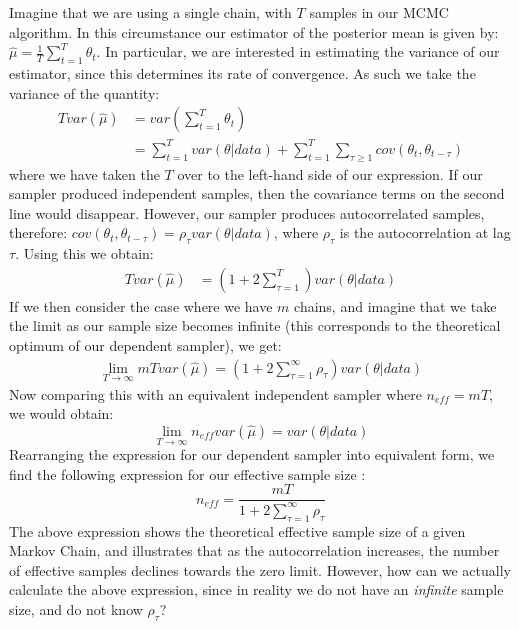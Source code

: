 \documentclass[11pt,fullpage]{book}
\begin{document}
Imagine that we are using a single chain, with $T$ samples in our MCMC algorithm. In this circumstance our estimator of the posterior mean is given by: $\hat{\mu}=\frac{1}{T}\sum\limits_{t=1}^{T} \theta_t$. In particular, we are interested in estimating the variance of our estimator, since this determines its rate of convergence. As such we take the variance of the quantity:
%
\begin{equation}
\begin{align}
T var(\hat{\mu}) &= var(\sum\limits_{t=1}^{T} \theta_t)\\
&= \sum\limits_{t=1}^{T} var(\theta|data) + \sum\limits_{t=1}^{T} \sum\limits_{\tau\geq 1} cov(\theta_t,\theta_{t-\tau})
\end{align}
\end{equation}
%
where we have taken the $T$ over to the left-hand side of our expression. If our sampler produced independent samples, then the covariance terms on the second line would disappear. However, our sampler produces autocorrelated samples, therefore: $cov(\theta_t,\theta_{t-\tau}) = \rho_\tau var(\theta|data)$, where $\rho_\tau$ is the autocorrelation at lag $\tau$. Using this we obtain:
%
\begin{equation}
\begin{align}
T var(\hat{\mu}) &= \left(1+ 2 \sum\limits_{\tau=1}^{T}\right) var(\theta|data)
\end{align}
\end{equation}
%
If we then consider the case where we have $m$ chains, and imagine that we take the limit as our sample size becomes infinite (this corresponds to the theoretical optimum of our dependent sampler), we get:
%
\begin{equation}
\begin{align}
\lim\limits_{T\rightarrow\infty} m T var(\hat{\mu}) = \left(1 + 2 \sum\limits_{\tau=1}^{\infty}\rho_\tau\right)var(\theta|data)
\end{align}
\end{equation}
%
Now comparing this with an equivalent independent sampler where $n_{eff} = m T$, we would obtain:
%
\begin{equation}
\lim\limits_{T\rightarrow\infty} n_{eff} var(\hat{\mu}) = var(\theta|data)
\end{equation}
%
Rearranging the expression for our dependent sampler into equivalent form, we find the following expression for our effective sample size \cite{gelman2013bayesian}:
%
\begin{equation}
n_{eff} = \frac{m T}{1 + 2 \sum\limits_{\tau=1}^{\infty}\rho_\tau}
\end{equation}
%
The above expression shows the theoretical effective sample size of a given Markov Chain, and illustrates that as the autocorrelation increases, the number of effective samples declines towards the zero limit. However, how can we actually calculate the above expression, since in reality we do not have an \textit{infinite} sample size, and do not know $\rho_\tau$?
\end{document}
